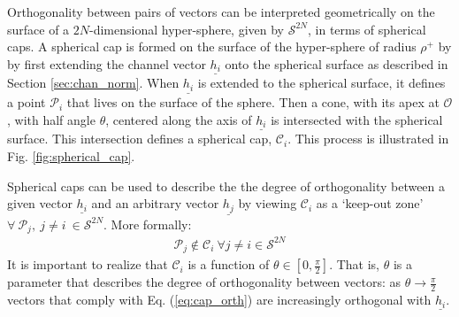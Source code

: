 Orthogonality between pairs of vectors can be interpreted geometrically on the surface of a $2N$-dimensional hyper-sphere, given by $\mathcal{S}^{2N}$,  in terms of spherical caps. A spherical cap is formed on the surface of the hyper-sphere of radius $\rho^+$ by by first extending the channel vector $\underline{h_i}$ onto the spherical surface as described in Section \ref{sec:chan_norm}. When $\underline{h_i}$ is extended to the spherical surface, it defines a point $\mathcal{P}_i$ that lives on the surface of the sphere. Then a cone, with its apex at $\mathcal{O}$, with half angle $\theta$, centered along the axis of $\underline{h_i}$ is intersected with the spherical surface. This intersection defines a spherical cap, $\mathcal{C}_i$. This process is illustrated in Fig. \ref{fig:spherical_cap}. 

Spherical caps can be used to describe the the degree of orthogonality between a given vector $\underline{h_i}$ and an arbitrary vector $\underline{h_j}$ by viewing $\mathcal{C}_i$ as a `keep-out zone' $\forall \  \mathcal{P}_j,\ j\neq i \ \in \mathcal{S}^{2N}$. More formally:
\begin{equation}\label{eq:cap_orth}
    \begin{aligned}
    \mathcal{P}_j \not\in \mathcal{C}_i\ \forall j\neq i \in \mathcal{S}^{2N}
    \end{aligned}
\end{equation}
It is important to realize that $\mathcal{C}_i$ is a function of $\theta \in [0,\frac{\pi}{2}]$. That is, $\theta$ is a parameter that describes the degree of orthogonality between vectors: as $\theta \rightarrow \frac{\pi}{2}$ vectors that comply with Eq. (\ref{eq:cap_orth}) are increasingly orthogonal with $\underline{h_i}$.

